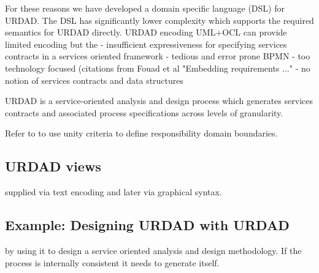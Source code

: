 For these reasons we have developed a domain specific language (DSL) for URDAD. The DSL has significantly lower complexity which supports the required semantics for URDAD directly. 
URDAD encoding
UML+OCL can provide limited encoding but the
  - insufficient expressiveness for specifying services contracts in a services oriented framework
  - tedious and error prone
BPMN
  - too technology focused (citations from Fouad et al "Embedding requirements ..."
  - no notion of services contracts and data structures  

URDAD is a service-oriented analysis and design process which generates services contracts and associated process specifications across levels of granularity. 

Refer to \cite{gonzalez_unity_2009} to use unity criteria to define responsibility domain boundaries.


\subsection{URDAD views}
\label{sec:urdadViews}

supplied via text encoding and later via graphical syntax.


\subsection{Example: Designing URDAD with URDAD}
\label{sec:urdadExample}
by using it to design a service oriented analysis and design methodology. If the process is internally consistent it needs to generate itself. 





